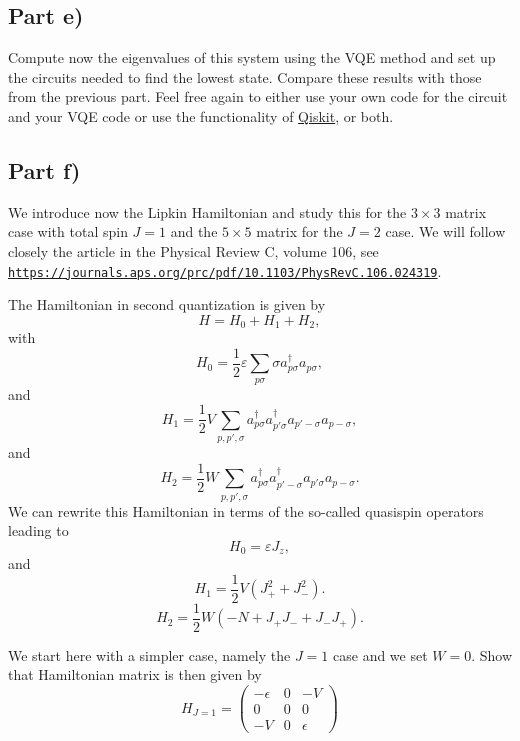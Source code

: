 \documentclass[%
oneside,                 %
final,                   %
10pt]{article}
\begin{document}
\subsection*{Part e)}

Compute now the eigenvalues of this system using the VQE method and
set up the circuits needed to find the lowest state. Compare these
results with those from the previous part. Feel free again to either
use your own code for the circuit and your VQE code or use the
functionality of \href{{https://qiskit.org/}}{Qiskit}, or both.

\subsection*{Part f)}

We introduce now the Lipkin Hamiltonian and study this for the
$3\times 3$ matrix case with total spin $J=1$ and the $5\times 5$
matrix for the $J=2$ case.
We will follow closely the article in the Physical Review C, volume 106, see \href{{https://journals.aps.org/prc/pdf/10.1103/PhysRevC.106.024319}}{\nolinkurl{https://journals.aps.org/prc/pdf/10.1103/PhysRevC.106.024319}}.

The Hamiltonian in second quantization is given by
\[
H = H_0 + H_1 +H_2,
\]
with 
\[
H_0 = \frac{1}{2} \varepsilon \sum_{p\sigma}\sigma a_{p\sigma}^{\dagger}a_{p\sigma},
\]
and
\[
H_1 = \frac{1}{2} V \sum_{p,p',\sigma} a_{p\sigma}^\dagger a_{p'\sigma}^\dagger a_{p'-\sigma} a_{p-\sigma},
\]
and
\[
H_{2} = \frac{1}{2} W \sum_{p,p',\sigma}a_{p\sigma}^\dagger a_{p'-\sigma}^\dagger a_{p'\sigma}a_{p-\sigma}.
\]
We can rewrite this Hamiltonian in terms of the so-called quasispin operators leading to
\begin{equation}
H_0 = \varepsilon J_z,
\end{equation}
and
\begin{equation}
H_1 = \frac{1}{2} V \left( J_+^2 + J_-^2 \right).
\end{equation}
\begin{equation}
H_2 = \frac{1}{2} W \left( -N + J_+ J_- + J_- J_+ \right).
\end{equation}

We start here with a simpler case, namely the $J=1$ case and we set $W=0$. Show that Hamiltonian matrix is then given by
\begin{equation}
H_{J = 1} =
\begin{pmatrix}-\epsilon & 0 & -V\\
 0&0&0\\
 -V&0&\epsilon
\end{pmatrix}
\end{equation}
\end{document}
